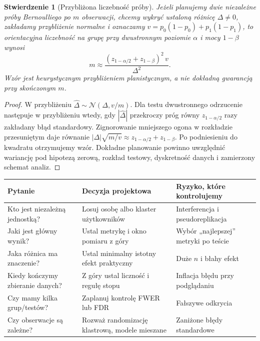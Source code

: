 \documentclass[11pt,a4paper,oneside]{report}
\numberwithin{equation}{chapter}
\theoremstyle{plain}
\newtheorem{stwierdzenie}[twierdzenie]{Stwierdzenie}
\theoremstyle{definition}
\theoremstyle{remark}
\newcommand{\Normal}{\mathcal N}
\begin{document}
\begin{stwierdzenie}[Przybliżona liczebność próby]\label{prop:ab-samplesize}
Jeżeli planujemy dwie niezależne próby Bernoulliego po $m$ obserwacji, chcemy wykryć ustaloną różnicę $\Delta\ne0$, zakładamy przybliżenie normalne i oznaczamy $v=p_0(1-p_0)+p_1(1-p_1)$, to orientacyjna liczebność na grupę przy dwustronnym poziomie $\alpha$ i mocy $1-\beta$ wynosi
\[
 m\approx\frac{(z_{1-\alpha/2}+z_{1-\beta})^2\,v}{\Delta^2}.
\]
Wzór jest heurystycznym przybliżeniem planistycznym, a nie dokładną gwarancją przy skończonym $m$.
\end{stwierdzenie}
\begin{proof}
W przybliżeniu $\widehat\Delta\sim\Normal(\Delta,v/m)$. Dla testu dwustronnego odrzucenie następuje w przybliżeniu wtedy, gdy $|\widehat\Delta|$ przekroczy próg równy $z_{1-\alpha/2}$ razy zakładany błąd standardowy. Zignorowanie mniejszego ogona w rozkładzie przesuniętym daje równanie $|\Delta|\sqrt{m/v}\approx z_{1-\alpha/2}+z_{1-\beta}$. Po podniesieniu do kwadratu otrzymujemy wzór. Dokładne planowanie powinno uwzględnić wariancję pod hipotezą zerową, rozkład testowy, dyskretność danych i zamierzony schemat analiz.
\end{proof}

\begin{center}\small
\begin{tabular}{>{\raggedright\arraybackslash}p{}>{\raggedright\arraybackslash}p{}>{\raggedright\arraybackslash}p{}}
\toprule
\textbf{Pytanie} & \textbf{Decyzja projektowa} & \textbf{Ryzyko, które kontrolujemy}\\
\midrule
Kto jest niezależną jednostką? & Losuj osobę albo klaster użytkowników & Interferencja i pseudoreplikacja\\
Jaki jest główny wynik? & Ustal metrykę i okno pomiaru z góry & Wybór „najlepszej” metryki po teście\\
Jaka różnica ma znaczenie? & Ustal minimalny istotny efekt praktyczny & Duże $n$ i błahy efekt\\
Kiedy kończymy zbieranie danych? & Z góry ustal liczność i regułę stopu & Inflacja błędu przy podglądaniu\\
Czy mamy kilka grup/testów? & Zaplanuj kontrolę FWER lub FDR & Fałszywe odkrycia\\
Czy obserwacje są zależne? & Rozważ randomizację klastrową, modele mieszane & Zaniżone błędy standardowe\\
\bottomrule
\end{tabular}
\end{center}
\end{document}

